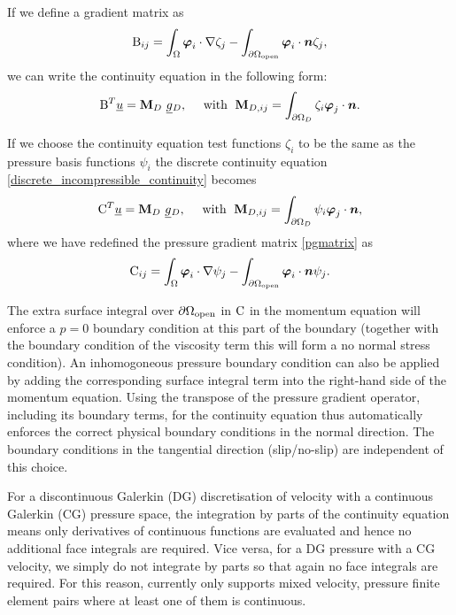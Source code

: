 If we define a gradient matrix as
\begin{equation*}
  \mathrm{B}_{ij}=\int_\Omega {\mbox{\boldmath$\varphi$}}_i\cdot\nabla\zeta_j
    -\int_{{\partial\Omega}_{\mathrm{open}}} {\mbox{\boldmath$\varphi$}}_i\cdot{\mbox{\boldmath$n$}}\zeta_j ,
\end{equation*}
we can write the continuity equation in the following form:
\begin{equation}
  \mathrm{B}^T \underline{u}=
    {\mbox{\boldmath$\mathrm{M}$}}_D ~\underline{g}{}_D,
    \quad\text{ with }\;
    {\mbox{\boldmath$\mathrm{M}$}}_{D,ij}=\int_{{\partial\Omega}_D} \zeta_i{\mbox{\boldmath$\varphi$}}_j\cdot{\mbox{\boldmath$n$}}.
  \label{discrete_incompressible_continuity}
\end{equation}

If we choose the continuity equation test functions $\zeta_{i}$ to be the 
same as the pressure basis functions $\psi_i$ the discrete continuity 
equation \eqref{discrete_incompressible_continuity} becomes
\begin{equation}
  \mathrm{C}^T \underline{u}=
    {\mbox{\boldmath$\mathrm{M}$}}_D ~\underline{g}{}_D,
    \quad\text{ with }\;
    {\mbox{\boldmath$\mathrm{M}$}}_{D,ij}=\int_{{\partial\Omega}_D} \psi_i{\mbox{\boldmath$\varphi$}}_j\cdot{\mbox{\boldmath$n$}},
  \label{discrete_incompressible_continuity_CT}
\end{equation}
where we have redefined the pressure gradient matrix \eqref{pgmatrix} as
\begin{equation*}
  \mathrm{C}_{ij}=\int_\Omega {\mbox{\boldmath$\varphi$}}_i\cdot\nabla\psi_j
    -\int_{{\partial\Omega}_{\mathrm{open}}} {\mbox{\boldmath$\varphi$}}_i\cdot{\mbox{\boldmath$n$}}\psi_j.
\end{equation*}

The extra surface integral over ${\partial\Omega}_{\mathrm{open}}$ in
$\mathrm{C}$ in the momentum equation will enforce
a $p=0$ boundary condition at this part of the boundary (together with the
boundary condition of the viscosity term this will form a no normal stress
condition). An inhomogoneous pressure boundary condition can also
be applied by adding the corresponding
surface integral term into the right-hand side of the momentum equation.
Using the transpose of the pressure gradient operator, including its
boundary terms, for the continuity equation thus automatically
enforces the correct physical boundary conditions in the normal
direction.
The boundary
conditions in the tangential direction (slip/no-slip) are independent of this choice.

For a discontinuous Galerkin (DG) discretisation of velocity with a continuous
Galerkin (CG) pressure space, the integration by parts of the continuity
equation means only derivatives of continuous functions are evaluated and hence
no additional face integrals are required. Vice versa, for a DG pressure with a CG
velocity, we simply do not integrate by parts so that again no face integrals
are required. For this reason, \fluidity currently only supports mixed velocity,
pressure finite element pairs where at least one of them is continuous.

